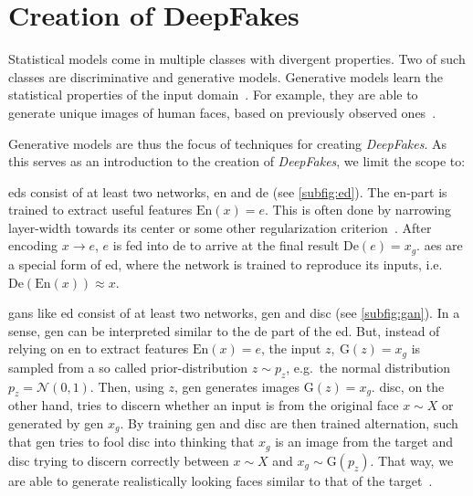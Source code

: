 \section{Creation of DeepFakes}\label{sect:creation-of-deepfakes}
Statistical models come in multiple classes with divergent properties.
Two of such classes are discriminative and generative models. Generative models
learn the statistical properties of the input domain~\cite[cf.][\nopp{}651\psqq]{Goodfellow.2016}.
For example, they are able to generate unique images of human faces, based on
previously observed ones~\cite{Karras.2019}.

\par
Generative models are thus the focus of techniques for creating \textit{DeepFakes}. As
this serves as an introduction to the creation of \textit{DeepFakes}, we limit the scope
to:
\begin{description}[leftmargin=0cm]
    \item[\glspl{ed}] \glspl{ed} consist of at least two networks, \gls{en} and
    \gls{de} (see \cref{subfig:ed}). The \gls{en}-part is trained to extract
    useful features \(\text{En}(x)=e\). This is often done by narrowing
    layer-width towards its center or some other regularization criterion~\cite[cf.][499-505]{Goodfellow.2016}.
    After encoding \(x \rightarrow e\), \(e\) is fed into \gls{de} to arrive at
    the final result \(\text{De}(e)=x_g\). \Glspl{ae} are a special form of
    \gls{ed}, where the network is trained to reproduce its inputs, i.e.\
    \(\text{De}(\text{En}(x))\approx x\).

    \item[\glspl{gan}] \glspl{gan} like \gls{ed} consist of at least two networks,
    \gls{gen} and \gls{disc} (see \cref{subfig:gan}). In a sense, \gls{gen} can
    be interpreted similar to the \gls{de} part of the \gls{ed}. But, instead of
    relying on \gls{en} to extract features \(\text{En}(x)=e\), the input
    \(z,\ \text{G}(z)=x_g\) is sampled from a so called prior-distribution
    \(z\sim p_z\), e.g.\ the normal distribution \(p_z=\mathcal{N}(0, 1)\). Then,
    using \(z\), \gls{gen} generates images \(\text{G}(z)=x_g\). \Gls{disc}, on
    the other hand, tries to discern whether an input is from the original face
    \(x\sim X\) or generated by \gls{gen} \(x_g\). By training \gls{gen} and
    \gls{disc} are then trained alternation, such that \gls{gen} tries to fool
    \gls{disc} into thinking that \(x_g\) is an image from the target and \gls{disc}
    trying to discern correctly between \(x\sim X\) and \(x_g\sim \text{G}(p_z)\).
    That way, we are able to generate realistically looking faces similar to that
    of the target~\cite{Goodfellow.2014}.
\end{description}
